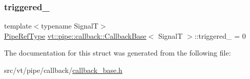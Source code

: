 \subsubsection{\texorpdfstring{triggered\+\_\+}{triggered\_}}
{\footnotesize\ttfamily template$<$typename SignalT$>$ \\
\hyperlink{namespacevt_ace18d74dd489d9ea506d38789fffce34}{Pipe\+Ref\+Type} \hyperlink{structvt_1_1pipe_1_1callback_1_1_callback_base}{vt\+::pipe\+::callback\+::\+Callback\+Base}$<$ SignalT $>$\+::triggered\+\_\+ = 0\hspace{0.3cm}{\ttfamily [private]}}



The documentation for this struct was generated from the following file\+:\begin{DoxyCompactItemize}
\item 
src/vt/pipe/callback/\hyperlink{callback__base_8h}{callback\+\_\+base.\+h}\end{DoxyCompactItemize}
